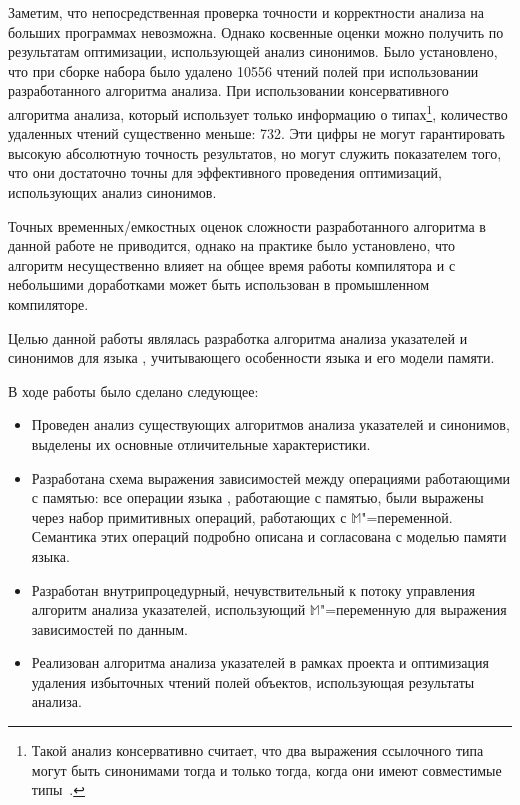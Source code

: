 \documentclass[14pt,titlepage,draft]{extarticle}
\newcommand{\java}{\eng{Java}\xspace}
\newcommand{\M}{\ensuremath{\mathbb{M}}}
\begin{document}
    Заметим, что непосредственная проверка точности и корректности анализа на
    больших программах невозможна. Однако косвенные оценки можно получить по
    результатам оптимизации, использующей анализ синонимов. Было установлено,
    что при сборке набора  было удалено \num{10556} чтений
    полей при использовании разработанного алгоритма анализа. При использовании
    консервативного алгоритма анализа, который использует только информацию о
    типах\footnote{
      Такой анализ консервативно считает, что два выражения ссылочного типа
      могут быть синонимами тогда и только тогда, когда они имеют совместимые
      типы~\cite{diwan_tbaa}.
    },
    количество удаленных чтений существенно меньше: \num{732}.
    Эти цифры не могут гарантировать высокую абсолютную точность результатов,
    но могут служить показателем того, что они достаточно точны для
    эффективного проведения оптимизаций, использующих анализ синонимов.

    Точных временных/емкостных оценок сложности разработанного алгоритма в
    данной работе не приводится, однако на практике было установлено, что
    алгоритм несущественно влияет на общее время работы компилятора и с
    небольшими доработками может быть использован в промышленном компиляторе.


    Целью данной работы являлась разработка алгоритма анализа указателей и
    синонимов для языка \java, учитывающего особенности языка и его модели
    памяти.

    В ходе работы было сделано следующее:
    \begin{itemize}
      \item Проведен анализ существующих алгоритмов анализа указателей и
            синонимов, выделены их основные отличительные характеристики.
      \item Разработана схема выражения зависимостей между операциями
            работающими с памятью: все операции языка \java, работающие с
            памятью, были выражены через набор примитивных операций, работающих
            с \M"=переменной. Семантика этих операций подробно описана и
            согласована с моделью памяти языка.
      \item Разработан внутрипроцедурный, нечувствительный к потоку управления
            алгоритм анализа указателей, использующий \M"=переменную для
            выражения зависимостей по данным.
      \item Реализован алгоритма анализа указателей в рамках проекта
             и оптимизация удаления избыточных чтений полей
            объектов, использующая результаты анализа.
    \end{itemize}
\end{document}
